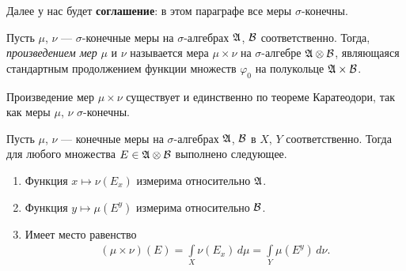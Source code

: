 Далее у нас будет \textbf{соглашение}: в этом параграфе все меры $\sigma$-конечны.

\begin{df}
 Пусть $\mu$, $\nu$ --- $\sigma$-конечные меры на $\sigma$-алгебрах $\mathfrak{A}$, $\mathcal{B}$ соответственно. Тогда, \textit{произведением мер} $\mu$ и $\nu$ называется мера $\mu \times \nu$ на $\sigma$-алгебре $\mathfrak{A} \otimes \mathcal{B}$, являющаяся стандартным продолжением функции множеств $\varphi_0$ на полукольце $\mathfrak{A} \times \mathcal{B}$.
\end{df}
\begin{remrk*}
 Произведение мер $\mu \times \nu$ существует и единственно по теореме Каратеодори, так как меры $\mu$, $\nu$ $\sigma$-конечны.
\end{remrk*}

\begin{thm}
\label{theorem:principle_cavalieri} 

Пусть $\mu$, $\nu$ --- конечные меры на  $\sigma$-алгебрах $\mathfrak{A}$, $\mathcal{B}$  в $X$, $Y$ соответственно. Тогда для любого множества  $E \in \mathfrak{A} \otimes \mathcal{B}$  выполнено следующее.
\begin{enumerate}
 \item Функция $x \mapsto \nu(E_x)$  измерима относительно $\mathfrak{A}$.
 \label{enum1:theorem:principle_cavalieri}
 \item Функция $y \mapsto \mu(E^{y})$  измерима относительно $\mathcal{B}$.
 \label{enum2:theorem:principle_cavalieri}
\item Имеет место равенство \begin{align*}
   (\mu \times \nu)(E) = \int\limits_{X} \nu(E_x) \, d\mu = \int\limits_{Y} \mu(E^{y}) \, d\nu
 .\end{align*} 
 \label{enum3:theorem:principle_cavalieri}
\end{enumerate}
\end{thm}


